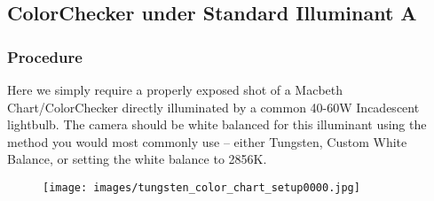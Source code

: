 \documentclass[twoside]{article}
\begin{document}
\subsection{ColorChecker under Standard Illuminant A}\label{chartA}

\subsubsection{Procedure}
Here we simply require a properly exposed shot of a Macbeth Chart/ColorChecker directly illuminated by a common 40-60W Incadescent lightbulb. The camera should be white balanced for this illuminant using the method you would most commonly use -- either Tungsten, Custom White Balance, or setting the white balance to 2856K.

\begin{figure}[ht]
    \centering
    \texttt{[image: images/tungsten\_color\_chart\_setup0000.jpg]}
\end{figure}
\end{document}
